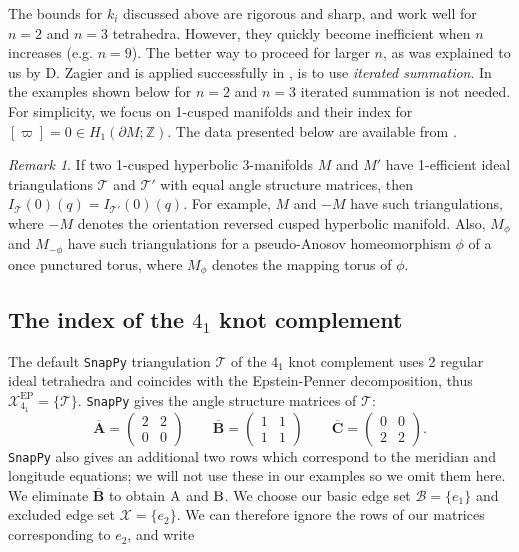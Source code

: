 \documentclass[12pt]{amsart}
\theoremstyle{definition}
\theoremstyle{remark}
\newtheorem{rmk}[thm]{Remark}
\def\Z{\mathbb{Z}}
\def\calX{\mathcal X}
\def\lbl{\label}
\newcommand{\CT}{\mathcal{T}}
\def\EP{\mathrm{EP}}
\newcommand{\mb}{\mathbf}
\def\bd{\partial}
\begin{document}
The bounds for $k_i$ discussed above are rigorous and sharp, and 
work well for $n=2$ and $n=3$ tetrahedra. However, they
quickly become inefficient when $n$ increases (e.g. $n=9$).
The better way to proceed for larger $n$, as was explained to us 
by D. Zagier and is applied successfully in \cite{GV}, is to use 
{\em iterated summation}. In the examples shown below for $n=2$ and $n=3$
iterated summation is not needed. For simplicity, we focus on 1-cusped
manifolds and their index for $[\varpi]=0 \in H_1(\bd M;\Z)$.
The data presented below are available from \cite{Ga:data}.

\begin{rmk}
\lbl{rem.same.index}
If two 1-cusped hyperbolic 3-manifolds $M$ and $M'$ have 1-efficient 
ideal triangulations $\CT$ and $\CT'$ with equal angle structure matrices, 
then $I_{\CT}(0)(q)=I_{\CT'}(0)(q)$.
For example, $M$ and $-M$ have
such triangulations, where $-M$ denotes the orientation reversed cusped
hyperbolic manifold. Also, $M_{\phi}$ and $M_{-\phi}$ have such
triangulations for a pseudo-Anosov
homeomorphism $\phi$ of a once punctured torus, where 
$M_{\phi}$ denotes the mapping torus of $\phi$.
\end{rmk}

\subsection{The index of the $4_1$ knot complement}
\lbl{sub.index41}

The default {\tt SnapPy} triangulation $\CT$ of the $4_1$ knot complement uses 2 regular
ideal tetrahedra and coincides with the Epstein-Penner decomposition,
thus $\calX_{4_1}^{\EP}=\{\CT\}$. {\tt SnapPy} gives the angle structure 
matrices of $\CT$:
$$
\overline{\mb A} =
\begin{pmatrix}
2 & 2 \\
0 & 0 
\end{pmatrix} \qquad
\overline{\mb B} =
\begin{pmatrix}
1 & 1 \\ 
1 & 1 
\end{pmatrix} \qquad
\overline{\mb C} =
\begin{pmatrix}
 0 & 0 \\
 2 & 2 
\end{pmatrix}.
$$
{\tt SnapPy} also gives an additional two rows which correspond to the meridian and longitude equations; we will
not use these in our examples so we omit them here. We eliminate $\overline{\mb B}$ to obtain $\rm A$ and $\rm B$. We choose our basic edge set $\mathcal B = \{e_1\}$ and excluded edge set $\mathcal X = \{e_2\}$. We can therefore ignore the rows of our matrices corresponding to $e_2$, and write 
\end{document}
